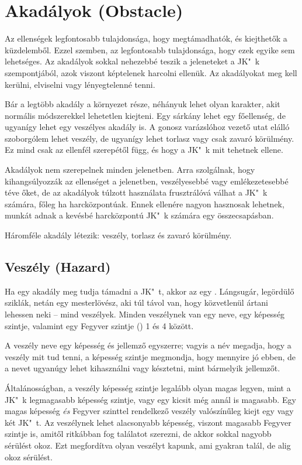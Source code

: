 \section[Akadályok]{Akadályok (Obstacle)}

Az ellenségek legfontosabb tulajdonsága, hogy megtámadhatók, és kiejthetők a küzdelemből. Ezzel szemben, az  legfontosabb tulajdonsága, hogy ezek egyike sem lehetséges. Az akadályok sokkal nehezebbé teszik a jeleneteket a JK"~k szempontjából, azok viszont képtelenek harcolni ellenük. Az akadályokat meg kell kerülni, elviselni vagy lényegtelenné tenni.

Bár a legtöbb akadály a környezet része, néhányuk lehet olyan karakter, akit normális módszerekkel lehetetlen kiejteni. Egy sárkány lehet egy főellenség, de ugyanígy lehet egy veszélyes akadály is. A gonosz varázslóhoz vezető utat elálló szoborgólem lehet veszély, de ugyanígy lehet torlasz vagy csak zavaró körülmény. Ez mind csak az ellenfél szerepétől függ, és hogy a JK"~k mit tehetnek ellene.

Akadályok nem szerepelnek minden jelenetben. Arra szolgálnak, hogy kihangsúlyozzák az ellenséget a jelenetben, veszélyesebbé vagy emlékezetesebbé téve őket, de az akadályok túlzott használata frusztrálóvá válhat a JK"~k számára, főleg ha harcközpontúak. Ennek ellenére nagyon hasznosak lehetnek, munkát adnak a kevésbé harcközpontú JK"~k számára egy összecsapásban.

Háromféle akadály létezik: veszély, torlasz és zavaró körülmény.

\subsection[Veszély]{Veszély (Hazard)}

Ha egy akadály meg tudja támadni a JK"~t, akkor az egy . Lángsugár, legördülő sziklák, netán egy mesterlövész, aki túl távol van, hogy közvetlenül ártani lehessen neki -- mind veszélyek. Minden veszélynek van egy neve, egy képesség szintje, valamint egy Fegyver szintje () 1 és 4 között.

A veszély neve egy képesség és jellemző egyszerre; vagyis a név megadja, hogy a veszély mit tud tenni, a képesség szintje megmondja, hogy mennyire jó ebben, de a nevet ugyanúgy lehet kihasználni vagy késztetni, mint bármelyik jellemzőt.

Általánosságban, a veszély képesség szintje legalább olyan magas legyen, mint a JK"~k legmagasabb képesség szintje, vagy egy kicsit még annál is magasabb. Egy magas képesség \emph{és} Fegyver szinttel rendelkező veszély valószínűleg kiejt egy vagy két JK"~t. Az veszélynek lehet alacsonyabb képesség, viszont magasabb Fegyver szintje is, amitől ritkábban fog találatot szerezni, de akkor sokkal nagyobb sérülést okoz. Ezt megfordítva olyan veszélyt kapunk, ami gyakran talál, de alig okoz sérülést.

